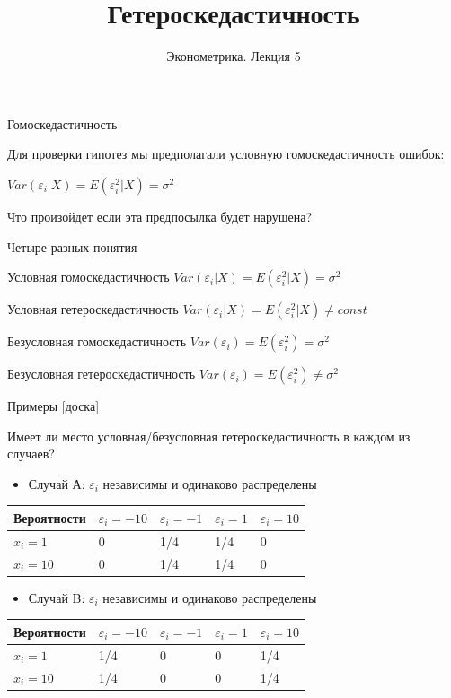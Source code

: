 \documentclass[ignorenonframetext,]{beamer}
\author[Эконометрика. Лекция 5]{Эконометрика. Лекция 5}
\title{Гетероскедастичность}
\date{}
\newcommand{\e}{\varepsilon}
\begin{document}
\frame{\titlepage}

\begin{frame}{Гомоскедастичность}

Для проверки гипотез мы предполагали условную гомоскедастичность ошибок:

\(Var(\varepsilon_i | X)=E(\varepsilon_i^2 | X)=\sigma^2\)

Что произойдет если эта предпосылка будет нарушена?

\end{frame}

\begin{frame}{Четыре разных понятия}

Условная гомоскедастичность
\(Var(\varepsilon_i | X)=E(\varepsilon_i^2 | X)=\sigma^2\)

Условная гетероскедастичность
\(Var(\varepsilon_i | X)=E(\varepsilon_i^2 | X) \neq const\)

Безусловная гомоскедастичность
\(Var(\varepsilon_i)=E(\varepsilon_i^2)=\sigma^2\)

Безусловная гетероскедастичность
\(Var(\varepsilon_i)=E(\varepsilon_i^2) \neq \sigma^2\)

\end{frame}

\begin{frame}{Примеры {[}доска{]}}

Имеет ли место условная/безусловная гетероскедастичность в каждом из
случаев?

\begin{itemize}
\itemsep1pt\parskip0pt
\item
  Случай А: \(\e_i\) независимы и одинаково распределены
\end{itemize}

\begin{longtable}[c]{@{}lllll@{}}
\toprule
Вероятности & \(\e_i=-10\) & \(\e_i=-1\) & \(\e_i=1\) &
\(\e_i=10\)\tabularnewline
\midrule
\endhead
\(x_i=1\) & 0 & 1/4 & 1/4 & 0\tabularnewline
\(x_i=10\) & 0 & 1/4 & 1/4 & 0\tabularnewline
\bottomrule
\end{longtable}

\begin{itemize}
\itemsep1pt\parskip0pt
\item
  Случай B: \(\e_i\) независимы и одинаково распределены
\end{itemize}

\begin{longtable}[c]{@{}lllll@{}}
\toprule
Вероятности & \(\e_i=-10\) & \(\e_i=-1\) & \(\e_i=1\) &
\(\e_i=10\)\tabularnewline
\midrule
\endhead
\(x_i=1\) & 1/4 & 0 & 0 & 1/4\tabularnewline
\(x_i=10\) & 1/4 & 0 & 0 & 1/4\tabularnewline
\bottomrule
\end{longtable}

\end{frame}
\end{document}
